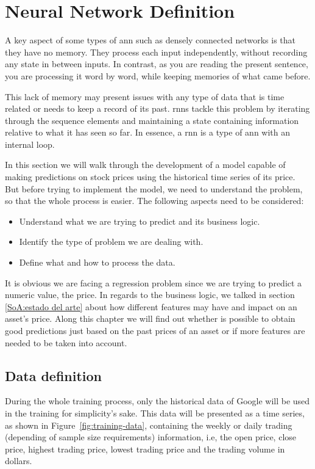 \section{Neural Network Definition}
\label{NN definition}

A key aspect of some types of \gls{ann} such as densely connected networks is that they have no memory. They process each input independently, without recording any state in between inputs. In contrast, as you are reading the present sentence, you are processing it word by word, while keeping memories of what came before\cite{deepWithPython}.

This lack of memory may present issues with any type of data that is time related or needs to keep a record of its past. \glspl{rnn} tackle this problem by iterating through the sequence elements and maintaining a state containing information relative to what it has seen so far. In essence, a \gls{rnn} is a type of \gls{ann} with an internal loop.

In this section we will walk through the development of a model capable of making predictions on stock prices using the historical time series of its price. But before trying to implement the model, we need to understand the problem, so that the whole process is easier. The following aspects need to be considered:

\begin{itemize}
    \item Understand what we are trying to predict and its business logic.
    \item Identify the type of problem we are dealing with.
    \item Define what and how to process the data.
\end{itemize}

It is obvious we are facing a regression problem since we are trying to predict a numeric value, the price. In regards to the business logic, we talked in section \ref{SoA:estado del arte} about how different features may have and impact on an asset's price. Along this chapter we will find out whether is possible to obtain good predictions just based on the past prices of an asset or if more features are needed to be taken into account.

\subsection{Data definition}

During the whole training process, only the historical data of Google will be used in the training for simplicity's sake. This data will be presented as a time series, as shown in Figure~\ref{fig:training-data}, containing the weekly or daily trading (depending of sample size requirements) information, i.e, the open price, close price, highest trading price, lowest trading price and the trading volume in dollars.

